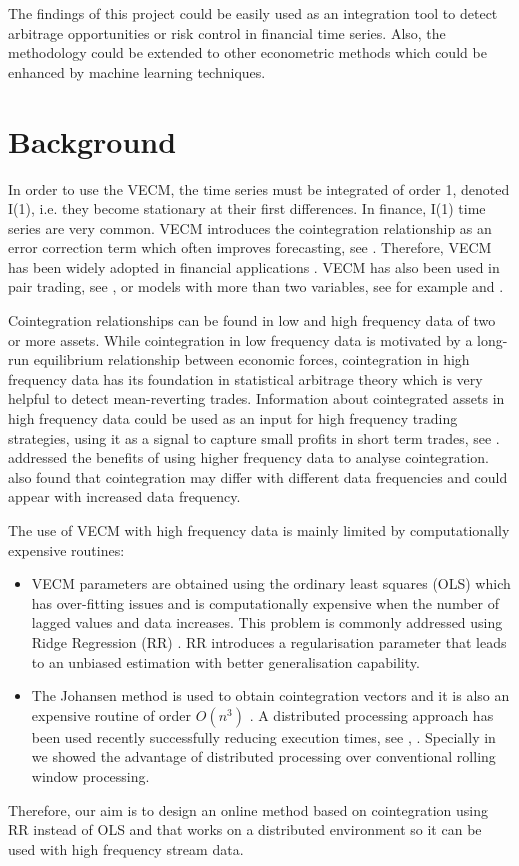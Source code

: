 \documentclass[12pt,reqno]{amsart}
\begin{document}
The findings of this project could be easily used as an integration tool
to detect arbitrage opportunities or risk control in financial time series. Also, the methodology could be extended to other econometric methods which could be enhanced by machine learning techniques.

\section{Background}

In order to use the VECM, the time series must be integrated of order 1, denoted I(1), i.e. they
become stationary at their first differences. In finance, I(1) time series are
very common. VECM introduces the cointegration relationship as an error correction
term which often improves forecasting, see \cite{duy1998}. Therefore, VECM has been widely adopted in
financial applications \cite{mukherjee1995,seong2013,maysami2000,arestis2001}. VECM has also been used in pair trading, see \cite{herlemont2003}, or models with more than two variables, see
for example \cite{mukherjee1995} and \cite{engle2004}.


Cointegration relationships can be found in low and high frequency data of two or
more assets. While cointegration in low frequency data is motivated by a
long-run equilibrium relationship between economic forces, cointegration in high
frequency data has its foundation in statistical arbitrage theory which is very helpful
to detect mean-reverting trades. Information about cointegrated assets in high
frequency data could be used as an input for high frequency trading strategies,
using it as a signal to capture small profits in short term trades, see
\cite{miao2014}. \cite{zhou2001} addressed the benefits of using higher
frequency data to analyse cointegration. \cite{rittler2012} also found that
cointegration may differ with different data frequencies and could appear
with increased data frequency.

The use of VECM with high frequency data is mainly limited by computationally
expensive routines:
\begin{itemize}
\item VECM parameters are obtained using the ordinary
least squares (OLS) which has over-fitting
issues and is computationally expensive when
the number of lagged values and data increases. This problem is commonly addressed using
Ridge Regression (RR) \cite{hoerl1970}. RR introduces a regularisation
parameter that leads to an unbiased estimation with better generalisation
capability. 
\item The Johansen method is used to obtain 
cointegration vectors and it is also an expensive routine  of order $O(n^3)$  \cite{johansen1995}. A distributed processing approach has been used recently successfully reducing execution times, see \cite{chen2003}, \cite{Arce2017}. Specially in \cite{Arce2017}we showed the advantage of distributed processing over conventional rolling window processing.
\end{itemize}
Therefore, our aim is to design an online method based on cointegration using RR instead of OLS and that works on a distributed environment so it can be used with high frequency stream data. 
\end{document}
